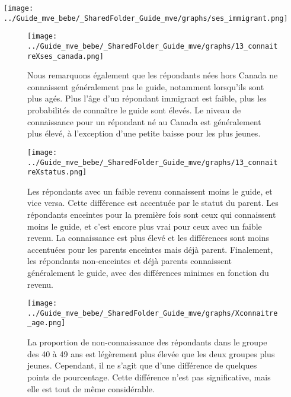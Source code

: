 \documentclass[
]{article}
\begin{document}
\texttt{[image: ../Guide\_mve\_bebe/\_SharedFolder\_Guide\_mve/graphs/ses\_immigrant.png]}

\begin{figure}[htbp]
  \centering
  \begin{minipage}{0.7\textwidth}
    \texttt{[image: ../Guide\_mve\_bebe/\_SharedFolder\_Guide\_mve/graphs/13\_connaitreXses\_canada.png]}
  \end{minipage}%
  \begin{minipage}{0.3\textwidth}
    \textbf{}Nous remarquons également que les répondants nées hors Canada ne connaissent généralement pas le guide, notamment lorsqu'ils sont plus agés. Plus l'âge d'un répondant immigrant est faible, plus les probabilités de connaître le guide sont élevés. Le niveau de connaissance pour un répondant né au Canada est généralement plus élevé, à l'exception d'une petite baisse pour les plus jeunes.

  \end{minipage}
\end{figure}

\begin{figure}[htbp] \centering
\begin{minipage}{0.6\textwidth}
    \texttt{[image: ../Guide\_mve\_bebe/\_SharedFolder\_Guide\_mve/graphs/13\_connaitreXstatus.png]}
  \end{minipage}
\begin{minipage}{0.4\textwidth}
  \textbf{} Les répondants avec un faible revenu connaissent moins le guide, et vice versa. Cette différence est accentuée par le statut du parent. Les répondants enceintes pour la première fois sont ceux qui connaissent moins le guide, et c'est encore plus vrai pour ceux avec un faible revenu. La connaissance est plus élevé et les différences sont moins accentuées pour les parents enceintes mais déjà parent. Finalement, les répondants non-enceintes et déjà parents connaissent généralement le guide, avec des différences minimes en fonction du revenu.
  \end{minipage}
  \end{figure}

\begin{figure}[htbp]
  \centering
  \begin{minipage}{0.5\textwidth}
    \texttt{[image: ../Guide\_mve\_bebe/\_SharedFolder\_Guide\_mve/graphs/Xconnaitre\_age.png]}
  \end{minipage}%
  \begin{minipage}{0.5\textwidth}
    \textbf{} La proportion de non-connaissance des répondants dans le groupe des 40 à 49 ans est légèrement plus élevée que les deux groupes plus jeunes. Cependant, il ne s'agit que d'une différence de quelques points de pourcentage. Cette différence n'est pas significative, mais elle est tout de même considérable.
  \end{minipage}
\end{figure}
\end{document}
